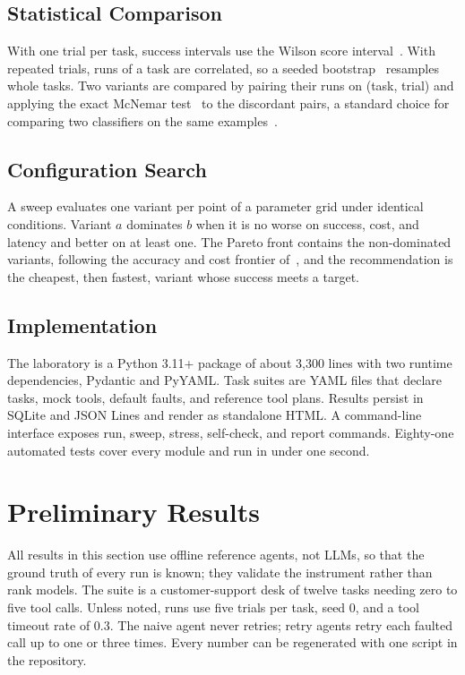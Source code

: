 \documentclass[conference,a4paper]{IEEEtran}
\begin{document}
\subsection{Statistical Comparison}
With one trial per task, success intervals use the Wilson score
interval~\cite{wilson1927}. With repeated trials, runs of a task are correlated, so a
seeded bootstrap~\cite{efron1979} resamples whole tasks. Two variants are compared by
pairing their runs on (task, trial) and applying the exact McNemar
test~\cite{mcnemar1947} to the discordant pairs, a standard choice for comparing two
classifiers on the same examples~\cite{dietterich1998}.

\subsection{Configuration Search}
A sweep evaluates one variant per point of a parameter grid under identical conditions.
Variant $a$ dominates $b$ when it is no worse on success, cost, and latency and better
on at least one. The Pareto front contains the non-dominated variants, following the
accuracy and cost frontier of~\cite{kapoor2024agents}, and the recommendation is the
cheapest, then fastest, variant whose success meets a target.

\subsection{Implementation}
The laboratory is a Python 3.11+ package of about 3,300 lines with two runtime
dependencies, Pydantic and PyYAML. Task suites are YAML files that declare tasks, mock
tools, default faults, and reference tool plans. Results persist in SQLite and JSON
Lines and render as standalone HTML. A command-line interface exposes run, sweep,
stress, self-check, and report commands. Eighty-one automated tests cover every module
and run in under one second.

\section{Preliminary Results}

All results in this section use offline reference agents, not LLMs, so that the ground
truth of every run is known; they validate the instrument rather than rank models.
The suite is a customer-support desk of twelve tasks needing zero to five tool calls.
Unless noted, runs use five trials per task, seed 0, and a tool timeout rate of 0.3.
The naive agent never retries; retry agents retry each faulted call up to one or three
times. Every number can be regenerated with one script in the repository.
\end{document}
